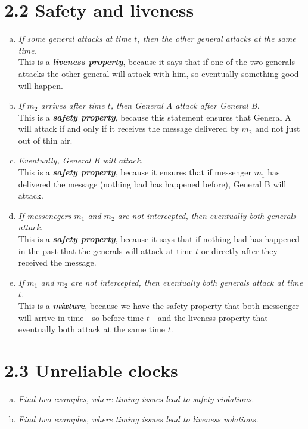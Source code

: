 \documentclass{article}
\begin{document}
	\section*{2.2 Safety and liveness}
	\begin{adjustwidth}{2em}{2em}	
		\begin{enumerate}[(a)]
			\item \textit{If some general attacks at time $t$, then the other general attacks at the same time.} \\
			This is a \textit{\textbf{liveness property}}, because it says that if one of the two generals attacks the other general will attack with him, so eventually something good will happen.
			\item \textit{If $m_2$ arrives after time $t$, then General A attack after General B.} \\
			This is a \textit{\textbf{safety property}}, because this statement ensures that General A will attack if and only if it receives the message delivered by $m_2$ and not just out of thin air.
			\item \textit{Eventually, General B will attack.} \\
			This is a \textit{\textbf{safety property}}, because it ensures that if messenger $m_1$ has delivered the message (nothing bad has happened before), General B will attack.
			\item \textit{If messenegers $m_1$ and $m_2$ are not intercepted, then eventually both generals attack.} \\
			This is a \textit{\textbf{safety property}}, because it says that if nothing bad has happened in the past that the generals will attack at time $t$ or directly after they received the message.
			\item \textit{If $m_1$ and $m_2$ are not intercepted, then eventually both generals attack at time $t$.} \\
			This is a \textit{\textbf{mixture}}, because we have the safety property that both messenger will arrive in time - so before time $t$ - and the liveness property that eventually both attack at the same time $t$.
		\end{enumerate}			
	\end{adjustwidth}
	
	\section*{2.3 Unreliable clocks}
	\begin{adjustwidth}{2em}{2em}
		\begin{enumerate}[(a)]
			\item \textit{Find two examples, where timing issues lead to safety violations.}
			\begin{adjustwidth}{2em}{2em}
			\end{adjustwidth}
			\item \textit{Find two examples, where timing issues lead to liveness volations.}
			\begin{adjustwidth}{2em}{2em}
			\end{adjustwidth}
		\end{enumerate}			
	\end{adjustwidth}
\end{document}

